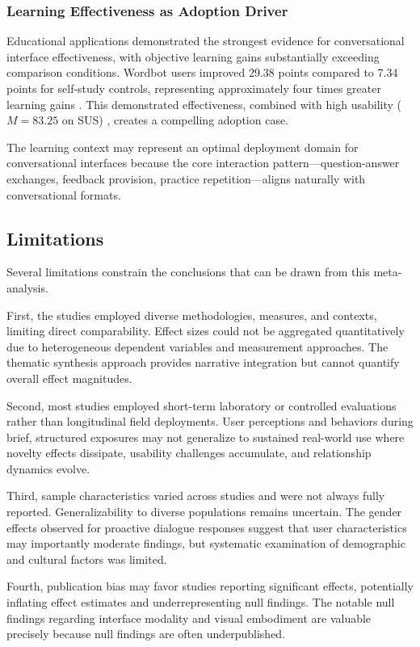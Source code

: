 \documentclass[manuscript,anonymous,sigconf]{acmart}
\begin{document}
\subsubsection{Learning Effectiveness as Adoption Driver}

Educational applications demonstrated the strongest evidence for conversational interface effectiveness, with objective learning gains substantially exceeding comparison conditions. Wordbot users improved 29.38 points compared to 7.34 points for self-study controls, representing approximately four times greater learning gains \cite{A34}. This demonstrated effectiveness, combined with high usability ($M = 83.25$ on SUS) \cite{A34}, creates a compelling adoption case.

The learning context may represent an optimal deployment domain for conversational interfaces because the core interaction pattern---question-answer exchanges, feedback provision, practice repetition---aligns naturally with conversational formats.

\subsection{Limitations}

Several limitations constrain the conclusions that can be drawn from this meta-analysis.

First, the studies employed diverse methodologies, measures, and contexts, limiting direct comparability. Effect sizes could not be aggregated quantitatively due to heterogeneous dependent variables and measurement approaches. The thematic synthesis approach provides narrative integration but cannot quantify overall effect magnitudes.

Second, most studies employed short-term laboratory or controlled evaluations rather than longitudinal field deployments. User perceptions and behaviors during brief, structured exposures may not generalize to sustained real-world use where novelty effects dissipate, usability challenges accumulate, and relationship dynamics evolve.

Third, sample characteristics varied across studies and were not always fully reported. Generalizability to diverse populations remains uncertain. The gender effects observed for proactive dialogue responses \cite{A16} suggest that user characteristics may importantly moderate findings, but systematic examination of demographic and cultural factors was limited.

Fourth, publication bias may favor studies reporting significant effects, potentially inflating effect estimates and underrepresenting null findings. The notable null findings regarding interface modality \cite{A15} and visual embodiment \cite{A86} are valuable precisely because null findings are often underpublished.
\end{document}
